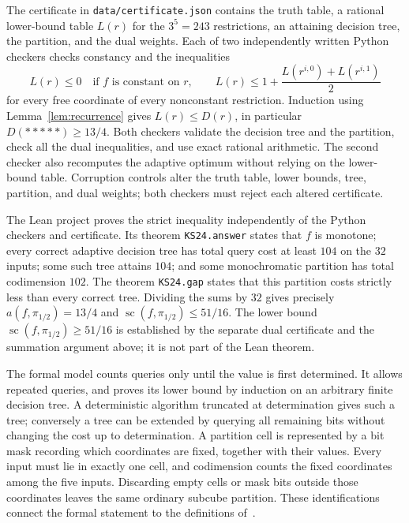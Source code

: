 \documentclass[11pt]{article}
\newcommand{\scplx}{\operatorname{sc}}
\begin{document}
The certificate in \texttt{data/certificate.json} contains the truth table,
a rational lower-bound table $L(r)$ for the $3^5=243$ restrictions, an
attaining decision tree, the partition, and the dual weights. Each of two
independently written Python checkers checks constancy and the inequalities
\[
 L(r)\leq0\quad\text{if $f$ is constant on $r$},\qquad
 L(r)\leq1+\frac{L(r^{i,0})+L(r^{i,1})}{2}
\]
for every free coordinate of every nonconstant restriction. Induction
using Lemma~\ref{lem:recurrence} gives $L(r)\leq D(r)$, in particular
$D(*****)\geq13/4$. Both checkers validate the decision tree and the
partition, check all the dual inequalities, and use exact rational
arithmetic. The second checker also recomputes the adaptive optimum
without relying on the lower-bound table. Corruption controls alter the
truth table, lower bounds, tree, partition, and dual weights; both checkers
must reject each altered certificate.

The Lean project proves the strict inequality independently of the Python
checkers and certificate. Its theorem \texttt{KS24.answer} states that
$f$ is monotone; every correct adaptive decision tree has total query cost
at least $104$ on the $32$ inputs; some such tree attains $104$; and some
monochromatic partition has total codimension $102$.
The theorem \texttt{KS24.gap} states that this partition costs strictly
less than every correct tree. Dividing the sums by $32$ gives precisely
$a(f,\pi_{1/2})=13/4$ and $\scplx(f,\pi_{1/2})\leq51/16$.
The lower bound $\scplx(f,\pi_{1/2})\geq51/16$ is established by the
separate dual certificate and the summation argument above; it is not
part of the Lean theorem.

The formal model counts queries only until the value is first determined.
It allows repeated queries, and proves its lower bound by induction on an
arbitrary finite decision tree. A deterministic algorithm truncated at
determination gives such a tree; conversely a tree can be extended by
querying all remaining bits without changing the cost up to determination.
A partition cell is represented by a bit mask recording which coordinates
are fixed, together with their values.
Every input must lie in exactly one cell, and codimension counts the fixed
coordinates among the five inputs. Discarding empty cells or mask bits
outside those coordinates leaves the same ordinary subcube partition.
These identifications connect the formal statement to the definitions
of~\cite{KS}.
\end{document}
